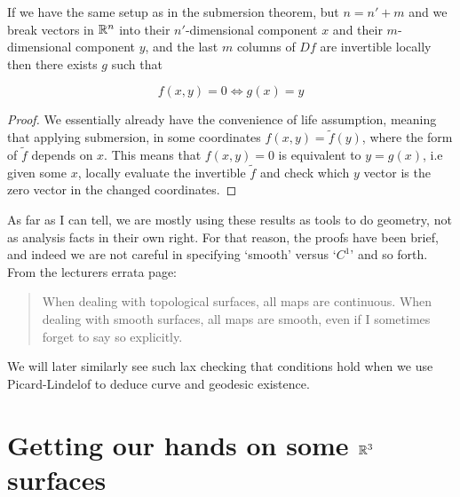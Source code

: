 \documentclass[11pt]{scrartcl}
\begin{document}
\begin{theorem}
If we have the same setup as in the submersion theorem, but $n = n' + m$ and we break vectors in $\mathbb R^n$ into their $n'$-dimensional component $x$ and their $m$-dimensional component $y$, and the last $m$ columns of $Df$ are invertible locally then there exists $g$ such that

\begin{equation}
    f(x,y) = 0 \Longleftrightarrow g(x) = y
\end{equation}

\begin{proof}
We essentially already have the convenience of life assumption, meaning that applying submersion, in some coordinates $f(x,y) = \tilde{f}(y)$, where the form of $\tilde{f}$ depends on $x$. This means that $f(x,y)=0$ is equivalent to $y = g(x)$, i.e given some $x$, locally evaluate the invertible $\tilde{f}$ and check which $y$ vector is the zero vector in the changed coordinates.
\end{proof}

\end{theorem}

\begin{remark}
As far as I can tell, we are mostly using these results as tools to do geometry, not as analysis facts in their own right. For that reason, the proofs have been brief, and indeed we are not careful in specifying `smooth' versus `$C^1$' and so forth. From the lecturers errata page:

\begin{quote}
    When dealing with topological surfaces, all maps are continuous. When dealing with smooth surfaces, all
    maps are smooth, even if I sometimes forget to say so explicitly.
\end{quote}

We will later similarly see such lax checking that conditions hold when we use Picard-Lindelof to deduce curve and geodesic existence.

\label{Ivan Wisdom}

\end{remark}

\section{Getting our hands on some $\mathbb R^3$ surfaces}
\end{document}
